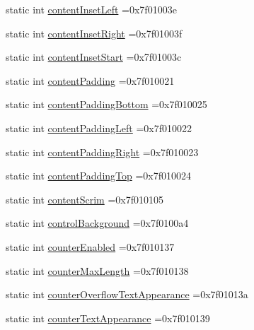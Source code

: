 \begin{DoxyCompactItemize}
\item 
static int \hyperlink{classandroid_1_1support_1_1v7_1_1cardview_1_1R_1_1attr_ac9a3713dc1e40a5608dcb7bf6b36f4a7}{content\+Inset\+Left} =0x7f01003e
\item 
static int \hyperlink{classandroid_1_1support_1_1v7_1_1cardview_1_1R_1_1attr_a521bca396b0fb2722f7dda4656f2d45c}{content\+Inset\+Right} =0x7f01003f
\item 
static int \hyperlink{classandroid_1_1support_1_1v7_1_1cardview_1_1R_1_1attr_a0fa2d8301062ba60e97d1f8229caa0e1}{content\+Inset\+Start} =0x7f01003c
\item 
static int \hyperlink{classandroid_1_1support_1_1v7_1_1cardview_1_1R_1_1attr_ad472a4ef5fdf1c61bfdaa26667c40b08}{content\+Padding} =0x7f010021
\item 
static int \hyperlink{classandroid_1_1support_1_1v7_1_1cardview_1_1R_1_1attr_a49d455b8fac184949496acb1dc210bf9}{content\+Padding\+Bottom} =0x7f010025
\item 
static int \hyperlink{classandroid_1_1support_1_1v7_1_1cardview_1_1R_1_1attr_a3a740be3cc8e533e2464bdbc5541f153}{content\+Padding\+Left} =0x7f010022
\item 
static int \hyperlink{classandroid_1_1support_1_1v7_1_1cardview_1_1R_1_1attr_a0853e7e5200f341f20030708dafe98c5}{content\+Padding\+Right} =0x7f010023
\item 
static int \hyperlink{classandroid_1_1support_1_1v7_1_1cardview_1_1R_1_1attr_affac5138f598c72e4b2d2e4d10e53711}{content\+Padding\+Top} =0x7f010024
\item 
static int \hyperlink{classandroid_1_1support_1_1v7_1_1cardview_1_1R_1_1attr_a69812852b5af9dc223c86ed8704bbacc}{content\+Scrim} =0x7f010105
\item 
static int \hyperlink{classandroid_1_1support_1_1v7_1_1cardview_1_1R_1_1attr_a9788ead14036f93aa243770c842b1fd0}{control\+Background} =0x7f0100a4
\item 
static int \hyperlink{classandroid_1_1support_1_1v7_1_1cardview_1_1R_1_1attr_ae86ff72f000a932b1608cfcce46c61a4}{counter\+Enabled} =0x7f010137
\item 
static int \hyperlink{classandroid_1_1support_1_1v7_1_1cardview_1_1R_1_1attr_a353e93d414f0a1430ad4bbdcb581d346}{counter\+Max\+Length} =0x7f010138
\item 
static int \hyperlink{classandroid_1_1support_1_1v7_1_1cardview_1_1R_1_1attr_a4a957d4beac1d3f3d9fd8967db38630c}{counter\+Overflow\+Text\+Appearance} =0x7f01013a
\item 
static int \hyperlink{classandroid_1_1support_1_1v7_1_1cardview_1_1R_1_1attr_aecc7241edce89e54265193066cf7bd25}{counter\+Text\+Appearance} =0x7f010139

\end{DoxyCompactItemize}

